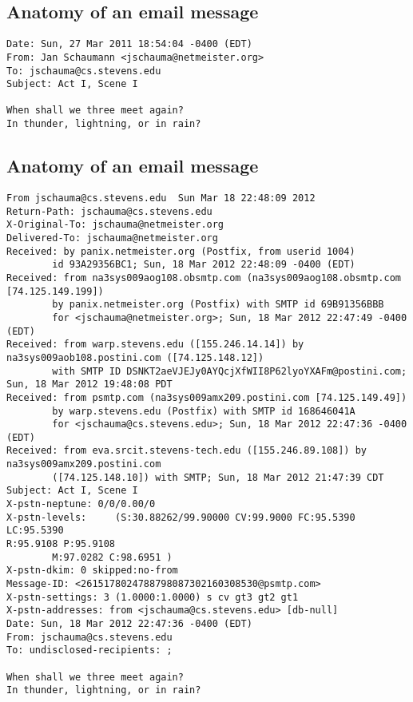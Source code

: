 \documentclass[xga]{xdvislides}
\begin{document}
\subsection{Anatomy of an email message}
\begin{verbatim}
Date: Sun, 27 Mar 2011 18:54:04 -0400 (EDT)
From: Jan Schaumann <jschauma@netmeister.org>
To: jschauma@cs.stevens.edu
Subject: Act I, Scene I

When shall we three meet again?
In thunder, lightning, or in rain?

\end{verbatim}

\subsection{Anatomy of an email message}
\small
\begin{verbatim}
From jschauma@cs.stevens.edu  Sun Mar 18 22:48:09 2012
Return-Path: jschauma@cs.stevens.edu
X-Original-To: jschauma@netmeister.org
Delivered-To: jschauma@netmeister.org
Received: by panix.netmeister.org (Postfix, from userid 1004)
        id 93A29356BC1; Sun, 18 Mar 2012 22:48:09 -0400 (EDT)
Received: from na3sys009aog108.obsmtp.com (na3sys009aog108.obsmtp.com [74.125.149.199])
        by panix.netmeister.org (Postfix) with SMTP id 69B91356BBB
        for <jschauma@netmeister.org>; Sun, 18 Mar 2012 22:47:49 -0400 (EDT)
Received: from warp.stevens.edu ([155.246.14.14]) by na3sys009aob108.postini.com ([74.125.148.12])
        with SMTP ID DSNKT2aeVJEJy0AYQcjXfWII8P62lyoYXAFm@postini.com; Sun, 18 Mar 2012 19:48:08 PDT
Received: from psmtp.com (na3sys009amx209.postini.com [74.125.149.49])
        by warp.stevens.edu (Postfix) with SMTP id 168646041A
        for <jschauma@cs.stevens.edu>; Sun, 18 Mar 2012 22:47:36 -0400 (EDT)
Received: from eva.srcit.stevens-tech.edu ([155.246.89.108]) by na3sys009amx209.postini.com
        ([74.125.148.10]) with SMTP; Sun, 18 Mar 2012 21:47:39 CDT
Subject: Act I, Scene I
X-pstn-neptune: 0/0/0.00/0
X-pstn-levels:     (S:30.88262/99.90000 CV:99.9000 FC:95.5390 LC:95.5390
R:95.9108 P:95.9108
        M:97.0282 C:98.6951 )
X-pstn-dkim: 0 skipped:no-from
Message-ID: <2615178024788798087302160308530@psmtp.com>
X-pstn-settings: 3 (1.0000:1.0000) s cv gt3 gt2 gt1
X-pstn-addresses: from <jschauma@cs.stevens.edu> [db-null]
Date: Sun, 18 Mar 2012 22:47:36 -0400 (EDT)
From: jschauma@cs.stevens.edu
To: undisclosed-recipients: ;

When shall we three meet again?
In thunder, lightning, or in rain?
\end{verbatim}
\Normalsize
\end{document}
